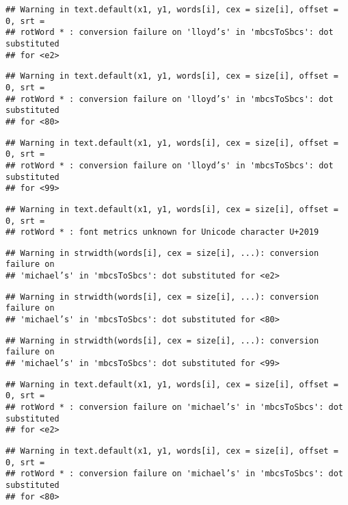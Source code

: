 \documentclass[
]{article}
\begin{document}
\begin{verbatim}
## Warning in text.default(x1, y1, words[i], cex = size[i], offset = 0, srt =
## rotWord * : conversion failure on 'lloyd’s' in 'mbcsToSbcs': dot substituted
## for <e2>
\end{verbatim}

\begin{verbatim}
## Warning in text.default(x1, y1, words[i], cex = size[i], offset = 0, srt =
## rotWord * : conversion failure on 'lloyd’s' in 'mbcsToSbcs': dot substituted
## for <80>
\end{verbatim}

\begin{verbatim}
## Warning in text.default(x1, y1, words[i], cex = size[i], offset = 0, srt =
## rotWord * : conversion failure on 'lloyd’s' in 'mbcsToSbcs': dot substituted
## for <99>
\end{verbatim}

\begin{verbatim}
## Warning in text.default(x1, y1, words[i], cex = size[i], offset = 0, srt =
## rotWord * : font metrics unknown for Unicode character U+2019
\end{verbatim}

\begin{verbatim}
## Warning in strwidth(words[i], cex = size[i], ...): conversion failure on
## 'michael’s' in 'mbcsToSbcs': dot substituted for <e2>
\end{verbatim}

\begin{verbatim}
## Warning in strwidth(words[i], cex = size[i], ...): conversion failure on
## 'michael’s' in 'mbcsToSbcs': dot substituted for <80>
\end{verbatim}

\begin{verbatim}
## Warning in strwidth(words[i], cex = size[i], ...): conversion failure on
## 'michael’s' in 'mbcsToSbcs': dot substituted for <99>
\end{verbatim}

\begin{verbatim}
## Warning in text.default(x1, y1, words[i], cex = size[i], offset = 0, srt =
## rotWord * : conversion failure on 'michael’s' in 'mbcsToSbcs': dot substituted
## for <e2>
\end{verbatim}

\begin{verbatim}
## Warning in text.default(x1, y1, words[i], cex = size[i], offset = 0, srt =
## rotWord * : conversion failure on 'michael’s' in 'mbcsToSbcs': dot substituted
## for <80>
\end{verbatim}
\end{document}
